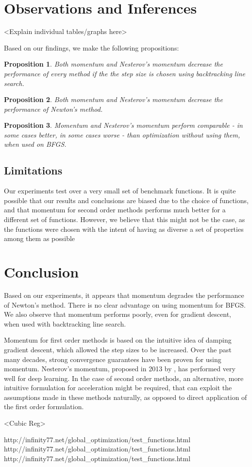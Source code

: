 \documentclass{article}
\newtheorem{prop}{Proposition}
\begin{document}
\section{Observations and Inferences}\label{inferences}
<Explain individual tables/graphs here>

Based on our findings, we make the following propositions:

\begin{prop}
	Both momentum and Nesterov's momentum decrease the performance of every method if the the step size is chosen using backtracking line search.
\end{prop}

\begin{prop}
	Both momentum and Nesterov's momentum decrease the performance of Newton's method. 
\end{prop}

\begin{prop}
	Momentum and Nesterov's momentum perform comparable - in some cases better, in some cases worse - than optimization without using them, when used on BFGS.
\end{prop}


\subsection{Limitations}
Our experiments test over a very small set of benchmark functions. It is quite possible that our results and conclusions are biased due to the choice of functions, and that momentum for second order methods performs much better for a different set of functions. However, we believe that this might not be the case, as the functions were chosen with the intent of having as diverse a set of properties among them as possible


\section{Conclusion}\label{conclusion}
Based on our experiments, it appears that momentum degrades the performance of Newton's method. There is no clear advantage on using momentum for BFGS. We also observe that momentum performs poorly, even for gradient descent, when used with backtracking line search.

Momentum for first order methods is based on the intuitive idea of damping gradient descent, which allowed the step sizes to be increased. Over the past many decades, strong convergence guarantees have been proven for using momentum. Nesterov's momentum, proposed in 2013 by \citet{Sutskever}, has performed very well for deep learning. In the case of second order methods, an alternative, more intuitive formulation for acceleration might be required, that can exploit the assumptions made in these methods naturally, as opposed to direct application of the first order formulation.

<Cubic Reg>

http://infinity77.net/global\_optimization/test\_functions.html
http://infinity77.net/global\_optimization/test\_functions.html
http://infinity77.net/global\_optimization/test\_functions.html


\end{document}
